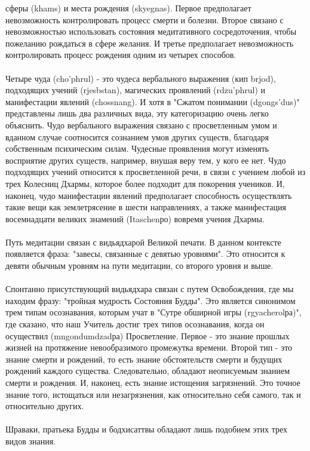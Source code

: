 сферы (khams) и места рождения (skyegnas). Первое предполагает невозможность
контролировать процесс смерти и болезни. Второе связано с невозможностью использовать
состояния медитативного сосредоточения, чтобы пожеланию рождаться в сфере желания. И
третье предполагает невозможность контролировать процесс рождения одним из четырех 
способов.\\
\\
Четыре чуда (cho'phrul) - это чудеса вербального выражения (кип brjod), подходящих учений 
(rjesbstan), магических проявлений (rdzu'phrul) и манифестации явлений (chossnang). И
хотя в "Сжатом понимании (dgongs'dus)" представлены лишь два различных вида, эту 
категоризацию очень легко объяснить. Чудо вербального выражения связано с
просветленным умом и вданном случае соотносится сознанием умов других существ, 
благодаря собственным психическим силам. Чудесные проявления могут изменять 
восприятие других существ, например, внушая веру тем, у кого ее нет. Чудо подходящих
учений относится к просветленной речи, в связи с учением любой из трех Колесниц Дхармы, 
которое более подходит для покорения учеников. И, наконец, чудо манифестации явлений 
предполагает способность осуществлять такие вещи как землетрясение в шести 
направлениях, а также манифестация восемнадцати великих знамений (Itaschenро) вовремя 
учения Дхармы.\\
\\
Путь медитации связан с видьядхарой Великой печати. В данном контексте появляется
фраза: "завесы, связанные с девятью уровнями". Это относится к девяти обычным уровням 
на пути медитации, со второго уровня и выше.\\
\\
Спонтанно присутствующий видьядхара связан с путем Освобождения, где мы находим
фразу: "тройная мудрость Состояния Будды". Это является синонимом трем типам
осознавания, которым учат в "Сутре обширной игры (rgyacherolра)", где сказано, что наш 
Учитель достиг трех типов осознавания, когда он осуществил (mngondumdzadра) 
Просветление. Первое - это знание прошлых жизней на протяжение невообразимого
промежутка времени. Второй тип - это знание смерти и рождений, то есть знание
обстоятельств смерти и будущих рождений каждого существа. Следовательно, обладают
неописуемым знанием смерти и рождения. И, наконец, есть знание истощения загрязнений. 
Это точное знание того, истощаться или незагрязнения, как относительно себя самого, так и
относительно других.\\
\\
Шраваки, пратьека Будды и бодхисаттвы обладают лишь подобием этих трех видов знания.
